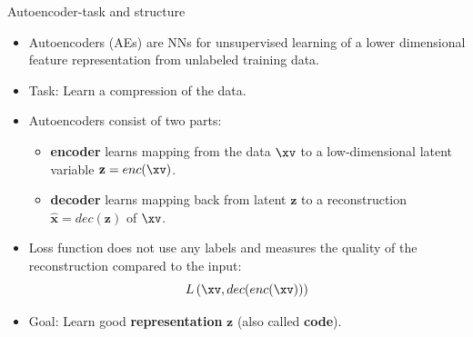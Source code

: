 \documentclass[11pt,compress,t,notes=noshow, xcolor=table]{beamer}
\begin{document}

\begin{vbframe}{Autoencoder-task and structure}

  \begin{itemize}
  \item Autoencoders (AEs) are %
  NNs for unsupervised learning of a lower dimensional feature representation from unlabeled training data.
  \item Task: Learn a compression of the data. 
  \item Autoencoders consist of two parts:
  \begin{itemize}
            \item \textbf{encoder} learns mapping from the data $\xv$ to a low-dimensional latent variable $\mathbf{z} = enc(\xv)$.
            \item \textbf{decoder} learns mapping back from latent $\mathbf{z} $ to a reconstruction  $\hat {\mathbf{x}} = dec(\mathbf{z})$ of $\xv$.
  \end{itemize}
    \item Loss function does not use any labels and measures the quality of the reconstruction compared to the input: 
    $$
      L\left(\xv, dec(enc(\xv))\right)
    $$
    \item Goal: Learn good \textbf{representation} $\mathbf{z}$ (also called \textbf{code}).

  \end{itemize}
  
\end{vbframe}
\end{document}
